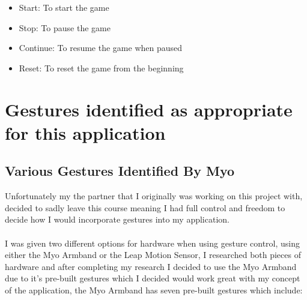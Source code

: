 \documentclass{article}
\begin{document}
\begin{itemize}
    \item Start: To start the game
    \item Stop: To pause the game
    \item Continue: To resume the game when paused
    \item Reset: To reset the game from the beginning
\end{itemize}

\section{Gestures identified as appropriate for this application}

\subsection{Various Gestures Identified By Myo}

Unfortunately my the partner that I originally was working on this project with, decided to sadly leave this course meaning I had full control and freedom to decide how I would incorporate gestures into my application.\\ \\
I was given two different options for hardware when using gesture control, using either the Myo Armband or the Leap Motion Sensor, I researched both pieces of hardware and after completing my research I decided to use the Myo Armband due to it's pre-built gestures which I decided would work great with my concept of the application, the Myo Armband has seven pre-built gestures which include:
\end{document}
